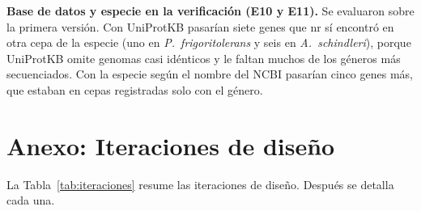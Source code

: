 \begin{table}[H]
\centering
\footnotesize
\setlength{\tabcolsep}{4pt}
\caption[Sensibilidad al modo de limpieza de Panaroo]{Pangenoma de cada especie
con los modos de limpieza \texttt{moderate} (caso base) y \texttt{sensitive}.}
\label{tab:sens_panaroo}
\end{table}

\textbf{Base de datos y especie en la verificación (E10 y E11).} Se evaluaron
sobre la primera versión. Con UniProtKB pasarían siete genes que nr sí encontró
en otra cepa de la especie (uno en \textit{P.~frigoritolerans} y seis en
\textit{A.~schindleri}), porque UniProtKB omite genomas casi idénticos y le
faltan muchos de los géneros más secuenciados. Con la especie según el nombre
del NCBI pasarían cinco genes más, que estaban en cepas registradas solo con el
género.

\section{Anexo: Iteraciones de diseño}
\label{anexo:iteraciones}

La Tabla~\ref{tab:iteraciones} resume las iteraciones de diseño. Después se
detalla cada una.

